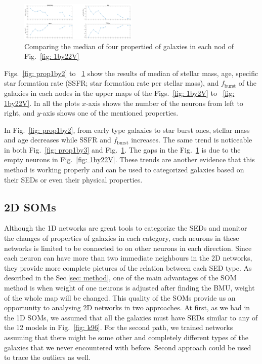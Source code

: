                 \begin{figure}
            \centering
            \includegraphics[width=0.5\textwidth]{../images/1d/prop1_by_22.png}
            \caption{Comparing the median of four propertied of galaxies in each nod of Fig.~\ref{fig: 1by22V}}
            \label{fig: prop1by22}
        \end{figure}
       
        Figs.~\ref{fig: prop1by2} to ~\ref{fig: prop1by22} show the results of median of stellar mass, age, specific star formation rate (SSFR; star formation rate per stellar mass), and $f_\mathrm{burst}$ of the galaxies in each nodes in the upper maps of the Figs.~\ref{fig: 1by2V} to ~\ref{fig: 1by22V}.
        In all the plots $x$-axis shows the number of the neurons from left to right, and $y$-axis shows one of the mentioned properties.
        
        In Fig.~\ref{fig: prop1by2}, from early type galaxies to star burst ones, stellar mass and age decreases while SSFR and $f_\mathrm{burst}$ increases. 
        The same trend is noticeable in both Fig.~\ref{fig: prop1by3} and Fig.~\ref{fig: prop1by22}. 
        The gaps in the Fig.~\ref{fig: prop1by22} is due to the empty neurons in Fig.~\ref{fig: 1by22V}. These trends are another evidence that this method is working properly and can be used to categorized galaxies based on their SEDs or even their physical properties.
        
    
    
    
    
    \subsection{2D SOMs}
    \label{sec: 2D}
    Although the 1D networks are great tools to categorize the SEDs and monitor the changes of properties of galaxies in each category, each neurons in these networks is limited to be connected to on other neurons in each direction.
    Since each neuron can have more than two immediate neighbours in the 2D networks, they provide more complete pictures of the relation between each SED type.
    As described in the Sec.\ref{sec: method}, one of the main advantages of the SOM method is when weight of one neurons is adjusted after finding the BMU, weight of the whole map will be changed.
    This quality of the SOMs provide us an opportunity to analysing 2D networks in two approaches. 
    At first, as we had in the 1D SOMs, we assumed that all the galaxies must have SEDs similar to any of the 12 models in Fig.~\ref{fig: k96}.
    For the second path, we trained networks assuming that there might be some other and completely different types of the galaxies that we never encountered with before.
    Second approach could be used to trace the outliers as well.
    
